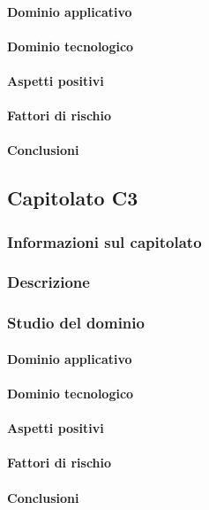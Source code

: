	\paragraph{Dominio applicativo}
	\paragraph{Dominio tecnologico}
	\paragraph{Aspetti positivi}
	\paragraph{Fattori di rischio}
	\paragraph{Conclusioni}
	
	\subsection{Capitolato C3}
	\subsubsection{Informazioni sul capitolato}
	\subsubsection{Descrizione}
	\subsubsection{Studio del dominio}
	\paragraph{Dominio applicativo}
	\paragraph{Dominio tecnologico}
	\paragraph{Aspetti positivi}
	\paragraph{Fattori di rischio}
	\paragraph{Conclusioni}
	
